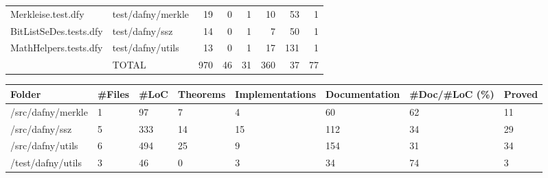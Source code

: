 \documentclass[a4paper, 12pt]{article}
\begin{document}
\begin{tabular}{llrrrrrr}
     Merkleise.test.dfy &  test/dafny/merkle &    19 &         0 &                1 &             10 &             53 &       1 \\
 BitListSeDes.tests.dfy &     test/dafny/ssz &    14 &         0 &                1 &              7 &             50 &       1 \\
  MathHelpers.tests.dfy &   test/dafny/utils &    13 &         0 &                1 &             17 &            131 &       1 \\
                        &              TOTAL &   970 &        46 &               31 &            360 &             37 &      77 \\
\bottomrule
\end{tabular}

\vspace{2em}
\begin{tabular}{llllllll}
\toprule
            Folder & \#Files & \#LoC & Theorems & Implementations & Documentation & \#Doc/\#LoC (\%) & Proved \\
\midrule
 /src/dafny/merkle &      1 &   97 &        7 &               4 &            60 &            62 &     11 \\
    /src/dafny/ssz &      5 &  333 &       14 &              15 &           112 &            34 &     29 \\
  /src/dafny/utils &      6 &  494 &       25 &               9 &           154 &            31 &     34 \\
 /test/dafny/utils &      3 &   46 &        0 &               3 &            34 &            74 &      3 \\
\bottomrule
\end{tabular}
\end{document}
